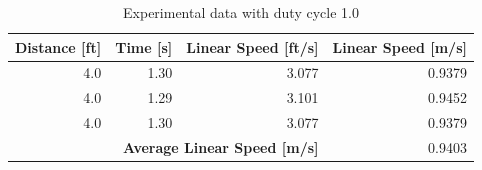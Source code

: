 \documentclass[fontsize=11pt, %
                             paper=letter, %
                             openany, %
                             captions=tableheading,
                             index=totoc,
                             hyperref]{labbook}
\begin{document}
\begin{addmargin}[0cm]{0cm}
\begin{table}[h!]
    \centering
    \begin{tabular}{r|r|r|r}
        \toprule
        \textbf{Distance [ft]} & \textbf{Time [s]} & \textbf{Linear Speed [ft/s]} & \textbf{Linear Speed [m/s]}\\
        \toprule
        4.0 & 1.30 & 3.077 & 0.9379\\
        4.0 & 1.29 & 3.101 & 0.9452\\
        4.0 & 1.30 & 3.077 & 0.9379\\
        \bottomrule
        \multicolumn{3}{r|}{\textbf{Average Linear Speed [m/s]}} & 0.9403\\
        \bottomrule
    \end{tabular}
    \caption{Experimental data with duty cycle 1.0}
    \label{tab:duty1.0}
\end{table}




\end{addmargin}
\end{document}
